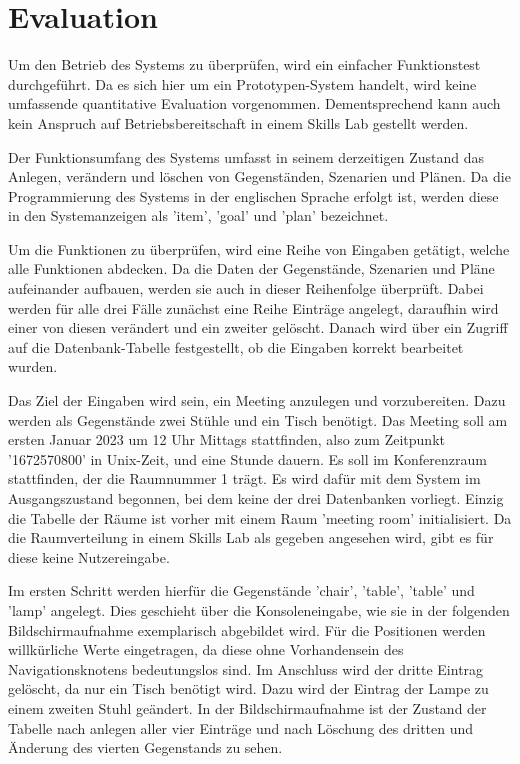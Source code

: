\FloatBarrier
\section{Evaluation}

Um den Betrieb des Systems zu überprüfen, wird ein einfacher Funktionstest durchgeführt. Da es sich hier um ein Prototypen-System handelt, wird keine umfassende quantitative Evaluation vorgenommen. Dementsprechend kann auch kein Anspruch auf Betriebsbereitschaft in einem Skills Lab gestellt werden.

Der Funktionsumfang des Systems umfasst in seinem derzeitigen Zustand das Anlegen, verändern und löschen von Gegenständen, Szenarien und Plänen. Da die Programmierung des Systems in der englischen Sprache erfolgt ist, werden diese in den Systemanzeigen als 'item', 'goal' und 'plan' bezeichnet.

Um die Funktionen zu überprüfen, wird eine Reihe von Eingaben getätigt, welche alle Funktionen abdecken. Da die Daten der Gegenstände, Szenarien und Pläne aufeinander aufbauen, werden sie auch in dieser Reihenfolge überprüft. Dabei werden für alle drei Fälle zunächst eine Reihe Einträge angelegt, daraufhin wird einer von diesen verändert und ein zweiter gelöscht. Danach wird über ein Zugriff auf die Datenbank-Tabelle festgestellt, ob die Eingaben korrekt bearbeitet wurden.

Das Ziel der Eingaben wird sein, ein Meeting anzulegen und vorzubereiten. Dazu werden als Gegenstände zwei Stühle und ein Tisch benötigt. Das Meeting soll am ersten Januar 2023 um 12 Uhr Mittags stattfinden, also zum Zeitpunkt '1672570800' in Unix-Zeit, und eine Stunde dauern. Es soll im Konferenzraum stattfinden, der die Raumnummer 1 trägt. Es wird dafür mit dem System im Ausgangszustand begonnen, bei dem keine der drei Datenbanken vorliegt. Einzig die Tabelle der Räume ist vorher mit einem Raum 'meeting room' initialisiert. Da die Raumverteilung in einem Skills Lab als gegeben angesehen wird, gibt es für diese keine Nutzereingabe.

Im ersten Schritt werden hierfür die Gegenstände 'chair', 'table', 'table' und 'lamp' angelegt. Dies geschieht über die Konsoleneingabe, wie sie in der folgenden Bildschirmaufnahme exemplarisch abgebildet wird. Für die Positionen werden willkürliche Werte eingetragen, da diese ohne Vorhandensein des Navigationsknotens bedeutungslos sind. Im Anschluss wird der dritte Eintrag gelöscht, da nur ein Tisch benötigt wird. Dazu wird der Eintrag der Lampe zu einem zweiten Stuhl geändert. In der Bildschirmaufnahme ist der Zustand der Tabelle nach anlegen aller vier Einträge und nach Löschung des dritten und Änderung des vierten Gegenstands zu sehen.

